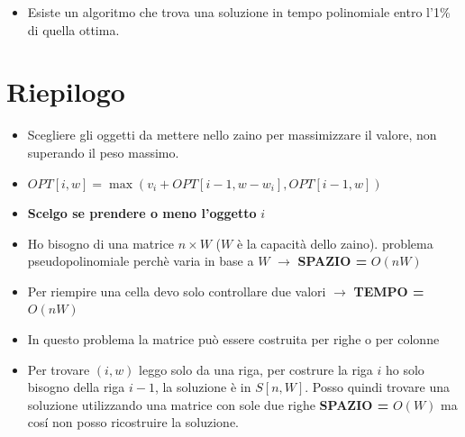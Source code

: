 \begin{itemize}
  \item Esiste un algoritmo che trova una soluzione in tempo polinomiale entro
        l'1\% di quella ottima.
\end{itemize}

\section{Riepilogo}

\begin{itemize}
  \item Scegliere gli oggetti da mettere nello zaino per massimizzare il
        valore, non superando il peso massimo.
  \item $OPT[i,w] = \max(v_i + OPT[i-1, w-w_i], OPT[i-1,w])$
  \item \textbf{Scelgo se prendere o meno l'oggetto} $i$
  \item Ho bisogno di una matrice $n \times W$ ($W$ è la capacità dello
        zaino). problema pseudopolinomiale perchè varia in base a $W$
        $\rightarrow$ \textbf{SPAZIO =} $O(nW)$
  \item Per riempire una cella devo solo controllare due valori
        $\rightarrow$ \textbf{TEMPO =} $O(nW)$
  \item In questo problema la matrice può essere costruita per righe o per
        colonne
  \item Per trovare $(i,w)$ leggo solo da una riga, per costrure la riga
        $i$ ho solo bisogno della riga $i-1$, la soluzione è in
        $S[n,W]$. Posso quindi trovare una soluzione utilizzando una matrice
        con sole due righe \textbf{SPAZIO =} $O(W)$ ma cosí non posso
        ricostruire la soluzione.
\end{itemize}
